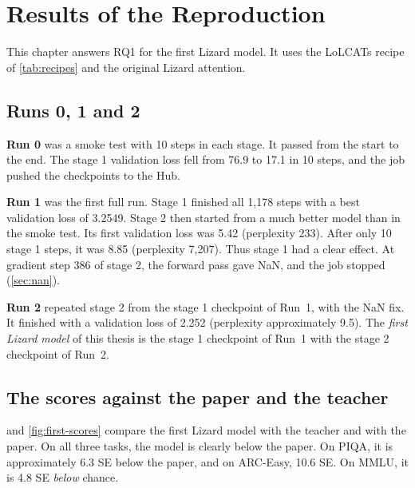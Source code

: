 \chapter{Results of the Reproduction}
\label{ch:repro}

This chapter answers RQ1 for the first Lizard model. It uses the LoLCATs recipe of \cref{tab:recipes} and the original Lizard attention.

\section{Runs 0, 1 and 2}
\label{sec:runs}

\textbf{Run 0} was a smoke test with 10 steps in each stage. It passed from the start to the end. The stage 1 validation loss fell from 76.9 to 17.1 in 10 steps, and the job pushed the checkpoints to the Hub.

\textbf{Run 1} was the first full run. Stage 1 finished all 1,178 steps with a best validation loss of 3.2549. Stage 2 then started from a much better model than in the smoke test. Its first validation loss was 5.42 (perplexity 233). After only 10 stage 1 steps, it was 8.85 (perplexity 7,207). Thus stage 1 had a clear effect. At gradient step 386 of stage 2, the forward pass gave NaN, and the job stopped (\cref{sec:nan}).

\textbf{Run 2} repeated stage 2 from the stage 1 checkpoint of Run~1, with the NaN fix. It finished with a validation loss of 2.252 (perplexity approximately 9.5). The \emph{first Lizard model} of this thesis is the stage 1 checkpoint of Run~1 with the stage 2 checkpoint of Run~2.

\section{The scores against the paper and the teacher}
\label{sec:first-scores}

 and \cref{fig:first-scores} compare the first Lizard model with the teacher and with the paper. On all three tasks, the model is clearly below the paper. On PIQA, it is approximately 6.3 SE below the paper, and on ARC-Easy, 10.6 SE. On MMLU, it is 4.8 SE \emph{below} chance.

